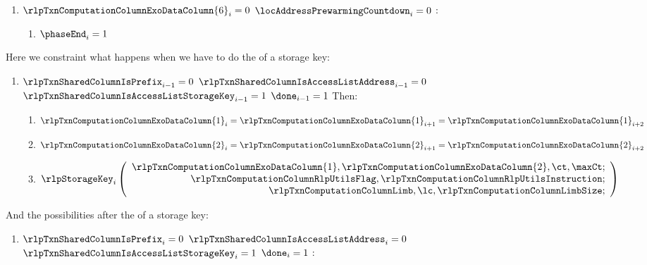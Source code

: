 \begin{enumerate}[resume]
\begin{enumerate}[resume]
\begin{enumerate}
					\item \If $\rlpTxnComputationColumnExoDataColumn{6} _{i} = 0$ \et $\locAddressPrewarmingCountdown _{i} = 0$ \Then:
						\begin{enumerate}
							\item $\phaseEnd _{i} = 1$
						\end{enumerate}
				\end{enumerate}
		\end{enumerate}

		Here we constraint what happens when we have to do the \rlp{} of a storage key:
		\begin{enumerate}[resume]
			\item \If $\rlpTxnSharedColumnIsPrefix _{i - 1} = 0$ \et $\rlpTxnSharedColumnIsAccessListAddress _{i - 1} = 0$ \et $\rlpTxnSharedColumnIsAccessListStorageKey _{i - 1} = 1$ \et $\done _{i - 1} =1$ Then:
				\begin{enumerate}
					\item $\rlpTxnComputationColumnExoDataColumn{1} _{i} = \rlpTxnComputationColumnExoDataColumn{1} _{i + 1} = \rlpTxnComputationColumnExoDataColumn{1} _{i + 2}$
					\item $\rlpTxnComputationColumnExoDataColumn{2} _{i} = \rlpTxnComputationColumnExoDataColumn{2} _{i + 1} = \rlpTxnComputationColumnExoDataColumn{2} _{i + 2}$
					\item \[
							\rlpStorageKey _{i}
							\left(
							\begin{array}{r}
								\rlpTxnComputationColumnExoDataColumn{1},
								\rlpTxnComputationColumnExoDataColumn{2},
								\ct,
								\maxCt; \\
								\rlpTxnComputationColumnRlpUtilsFlag,
								\rlpTxnComputationColumnRlpUtilsInstruction; \\
								\rlpTxnComputationColumnLimb,
								\lc,
								\rlpTxnComputationColumnLimbSize; \\
							\end{array}
							\right)
						\]
				\end{enumerate}
		\end{enumerate}
		And the possibilities after the \rlp{} of a storage key:
		\begin{enumerate}[resume]
			\item \If $\rlpTxnSharedColumnIsPrefix _{i} = 0$ \et $\rlpTxnSharedColumnIsAccessListAddress _{i} = 0$ \et $\rlpTxnSharedColumnIsAccessListStorageKey _{i} = 1$ \et $\done _{i} =1$ \Then:
				\begin{enumerate}

\end{enumerate}
\end{enumerate}
\end{enumerate}
